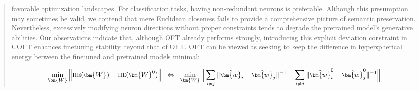 \begin{itemize}[leftmargin=*,nosep]
\begin{abstract}
favorable optimization landscapes. For classification tasks, having non-redundant neurons is preferable. Although this presumption may sometimes be valid, we contend that mere Euclidean closeness fails to provide a comprehensive picture of semantic preservation. Nevertheless, excessively modifying neuron directions without proper constraints tends to degrade the pretrained model’s generative abilities. Our observations indicate that, although OFT already performs strongly, introducing this explicit deviation constraint in COFT enhances finetuning stability beyond that of OFT. OFT can be viewed as seeking to keep the difference in hyperspherical energy between the finetuned and pretrained models minimal:

\begin{equation}\label{eq:oft_principle}
\footnotesize
\min_{\bm{W}} \left\| \text{HE}(\bm{W})-\text{HE}(\bm{W}^0)\right\|~~\Leftrightarrow~~\min_{\bm{W}} \bigg{\|} \sum_{i\neq j} \|\hat{\bm{w}}_i-\hat{\bm{w}}_j\|^{-1}-\sum_{i\neq j} \|\hat{\bm{w}}^0_i-\hat{\bm{w}}^0_j\|^{-1}\bigg{\|}
\end{equation}


\end{abstract}
\end{itemize}
